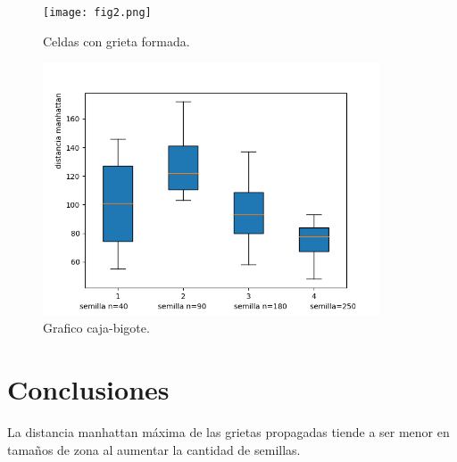 \documentclass{article}
\begin{document}
\begin{figure} [h!]%
    \centering
    \texttt{[image: fig2.png]} %
    \caption{Celdas con grieta formada.}
    \label{fig2}
\end{figure}

\begin{figure} [h!]%
    \centering
    \includegraphics[width=100mm]{p4.png} %
    \caption{Grafico caja-bigote.}
    \label{fig3}
\end{figure}
 

\section{Conclusiones} 

La distancia manhattan máxima de las grietas propagadas tiende a ser menor en tamaños de zona al aumentar la cantidad de semillas.






\end{document}

